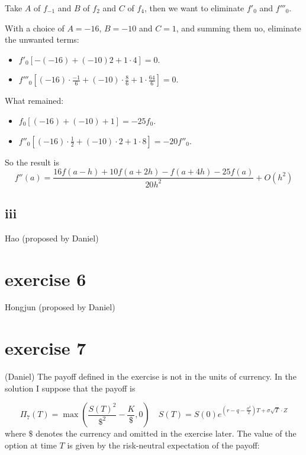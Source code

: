 \documentclass{article}
\begin{document}
Take $A$ of $f_{-1}$ and $B$ of $f_{2}$ and $C$ of $f_4$,
then we want to eliminate $f'_0$ and $f'''_0$.

With a choice of $A=-16$, $B=-10$ and $C=1$, and summing them uo, eliminate the unwanted terms:
\begin{itemize}
    \item $f'_0 [-(-16) + (-10)2 + 1\cdot 4] = 0$.
    \item $f'''_0 [(-16)\cdot \frac{-1}{6} + (-10)\cdot \frac{8}{6} + 1\cdot \frac{64}{6}] = 0$.
\end{itemize}
What remained:
\begin{itemize}
    \item $f_0 [(-16) + (-10) + 1] = -25f_0$.
    \item $f''_0 [(-16)\cdot \frac{1}{2} + (-10)\cdot 2 + 1\cdot 8] = -20f''_0$.
\end{itemize}

So the result is
\[f''\left( a \right)=\frac{16f\left( a-h \right)+10f\left( a+2h \right)-f\left( a+4h \right)-25f\left( a \right)}{20{{h}^{2}}}+O\left( {{h}^{2}} \right)\]
\subsection*{iii}
Hao (proposed by Daniel)

\section*{exercise 6}
Hongjun (proposed by Daniel)

\section*{exercise 7}
 (Daniel) The payoff defined in the exercise is not in the units of currency. In the solution I suppose that the payoff is

\[{{\Pi }_{7}}\left( T \right)=\max \left( \frac{S{{\left( T \right)}^{2}}}{{{\$}^{2}}}-\frac{K}{\$},0 \right)\quad S\left( T \right)=S\left( 0 \right){{e}^{\left( r-q-\frac{{{\sigma }^{2}}}{2} \right)T+\sigma \sqrt{T}\cdot Z}}\]
where $\$$ denotes the currency and omitted in the exercise later. The value of the option at time $T$ is given by the risk-neutral expectation of the payoff:
\end{document}
